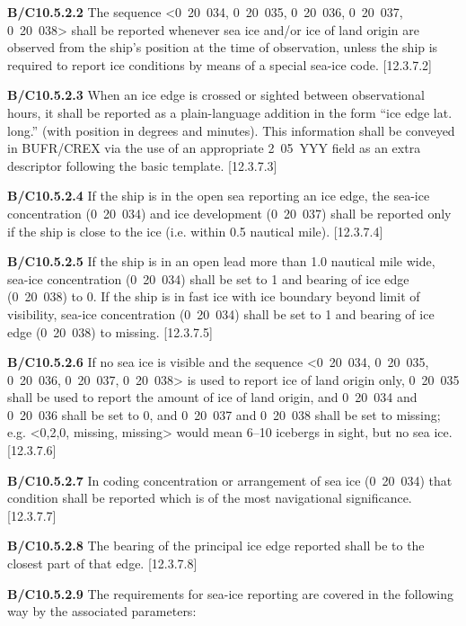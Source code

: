 \textbf{B/C10.5.2.2} The sequence \textless0~20~034, 0~20~035, 0~20~036, 0~20~037, 0~20~038\textgreater{} shall be reported whenever sea ice and/or ice of land origin are observed from the ship's position at the time of observation, unless the ship is required to report ice conditions by means of a special sea-ice code. {[}12.3.7.2{]}

\textbf{B/C10.5.2.3} When an ice edge is crossed or sighted between observational hours, it shall be reported as a plain-language addition in the form ``ice edge lat. long.'' (with position in degrees and minutes). This information shall be conveyed in BUFR/CREX via the use of an appropriate 2~05~YYY field as an extra descriptor following the basic template. {[}12.3.7.3{]}

\textbf{B/C10.5.2.4} If the ship is in the open sea reporting an ice edge, the sea-ice concentration (0~20~034) and ice development (0~20~037) shall be reported only if the ship is close to the ice (i.e. within 0.5 nautical mile). {[}12.3.7.4{]}

\textbf{B/C10.5.2.5} If the ship is in an open lead more than 1.0 nautical mile wide, sea-ice concentration (0~20~034) shall be set to 1 and bearing of ice edge (0~20~038) to 0. If the ship is in fast ice with ice boundary beyond limit of visibility, sea-ice concentration (0~20~034) shall be set to 1 and bearing of ice edge (0~20~038) to missing. {[}12.3.7.5{]}

\textbf{B/C10.5.2.6} If no sea ice is visible and the sequence \textless0~20~034, 0~20~035, 0~20~036, 0~20~037, 0~20~038\textgreater{} is used to report ice of land origin only, 0~20~035 shall be used to report the amount of ice of land origin, and 0~20~034 and 0~20~036 shall be set to 0, and 0~20~037 and 0~20~038 shall be set to missing; e.g. \textless0,2,0, missing, missing\textgreater{} would mean 6--10 icebergs in sight, but no sea ice. {[}12.3.7.6{]}

\textbf{B/C10.5.2.7} In coding concentration or arrangement of sea ice (0~20~034) that condition shall be reported which is of the most navigational significance. {[}12.3.7.7{]}

\textbf{B/C10.5.2.8} The bearing of the principal ice edge reported shall be to the closest part of that edge. {[}12.3.7.8{]}

\textbf{B/C10.5.2.9} The requirements for sea-ice reporting are covered in the following way by the associated parameters:

